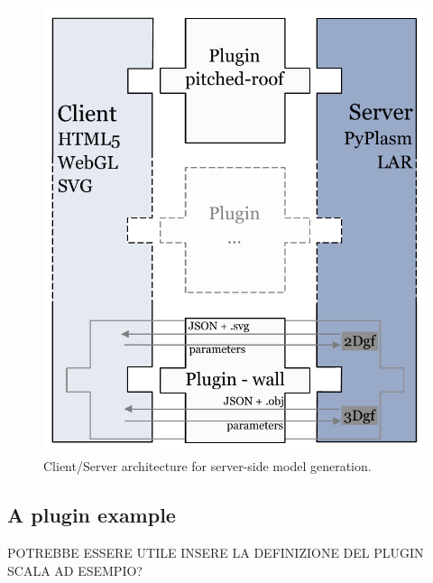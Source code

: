 \begin{figure}[htbp] %
   \centering

   \includegraphics[width=0.6\linewidth]{images/architecture-h}

   \caption{Client/Server architecture for server-side model generation.}
   \label{fig:c-s-arch}
\end{figure}

\subsection{A plugin example}

POTREBBE ESSERE UTILE INSERE LA DEFINIZIONE DEL PLUGIN SCALA AD ESEMPIO?


